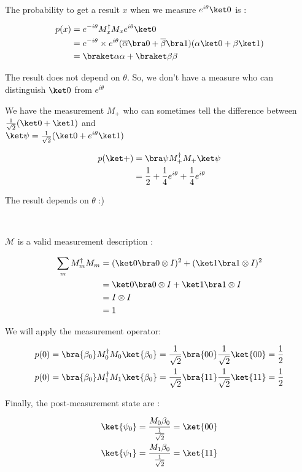 ~

The probability to get a result $x$ when we measure $e^{i\theta} \ket 0$ is :

\begin{align*}
  p(x) &= e^{-i\theta } M_x^\dagger M_x e^{i\theta}\ket 0 \\
  &= e^{-i\theta}\times e^{i\theta}(\overline\alpha \bra 0 + \overline\beta \bra 1)
      (\alpha \ket 0 + \beta \ket 1) \\
  &= \braket \alpha \alpha + \braket \beta \beta
\end{align*}

The result does not depend on $\theta$. So, we don't have a measure who can
distinguish $\ket 0$ from $e^{i\theta}$

We have the measurement $M_+$ who can sometimes tell the difference between
$\frac{1}{\sqrt 2}(\ket 0 + \ket 1)$ and \\
$\ket \psi = \frac{1}{\sqrt 2}(\ket 0 + e^{i\theta}\ket 1)$

\begin{align*}
  p(\ket +) &= \bra \psi M_+^\dagger M_+ \ket \psi \\
  &= \frac 1 2 + \frac 1 4 e^{i\theta} + \frac 1 4 e^{i\theta}
\end{align*}

The result depends on $\theta$ :)

~

$\mathcal M$ is a valid measurement description :

\begin{align*}
  \sum_m M_m^\dagger M_m &=
    (\ket 0 \bra 0 \otimes I)^2 + (\ket 1 \bra 1 \otimes I)^2 \\
    &= \ket 0 \bra 0 \otimes I + \ket 1 \bra 1 \otimes I \\
    &= I \otimes I \\
    &= 1
\end{align*}

We will apply the measurement operator:

\begin{align*}
  p(0) &= \bra{\beta_0}M_0^\dagger M_0 \ket{\beta_0} =
  \frac{1}{\sqrt 2}\bra{00}\frac{1}{\sqrt 2}\ket{00} = \frac 1 2 \\
  p(0) &= \bra{\beta_0}M_1^\dagger M_1 \ket{\beta_0} =
  \frac{1}{\sqrt 2}\bra{11}\frac{1}{\sqrt 2}\ket{11} = \frac 1 2
\end{align*}

Finally, the post-measurement state are :

\begin{align*}
  \ket{\psi_0} &= \frac{M_0\beta_0}{\frac{1}{\sqrt 2}} = \ket{00} \\
  \ket{\psi_1} &= \frac{M_1\beta_0}{\frac{1}{\sqrt 2}} = \ket{11}
\end{align*}

